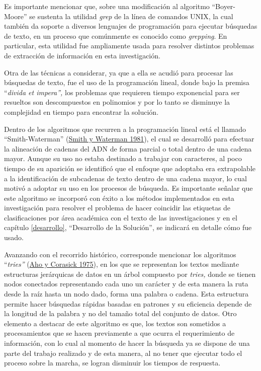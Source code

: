 \documentclass[
  12pt,
  openany]{book}
\begin{document}
Es importante mencionar que, sobre una modificación al algoritmo ``Boyer-Moore'' se sustenta la utilidad \emph{grep} de la línea de comandos UNIX, la cual también da soporte a diversos lenguajes de programación para ejecutar búsquedas de texto, en un proceso que comúnmente es conocido como \emph{grepping}. En particular, esta utilidad fue ampliamente usada para resolver distintos problemas de extracción de información en esta investigación.

Otra de las técnicas a considerar, ya que a ella se acudió para procesar las búsquedas de texto, fue el uso de la programación lineal, donde bajo la premisa ``\emph{divida et impera'',} los problemas que requieren tiempo exponencial para ser resueltos son descompuestos en polinomios y por lo tanto se disminuye la complejidad en tiempo para encontrar la solución.

Dentro de los algoritmos que recurren a la programación lineal está el llamado ``Smith-Waterman'' (\protect\hyperlink{ref-smith1981}{Smith y Waterman 1981}), el cual se desarrolló para efectuar la alineación de cadenas del ADN de forma parcial o total dentro de una cadena mayor. Aunque su uso no estaba destinado a trabajar con caracteres, al poco tiempo de su aparición se identificó que el enfoque que adoptaba era extrapolable a la identificación de subcadenas de texto dentro de una cadena mayor, lo cual motivó a adoptar su uso en los procesos de búsqueda. Es importante señalar que este algoritmo se incorporó con éxito a los métodos implementados en esta investigación para resolver el problema de hacer coincidir las etiquetas de clasificaciones por área académica con el texto de las investigaciones y en el capítulo \ref{desarrollo}, ``Desarrollo de la Solución'', se indicará en detalle cómo fue usado.

Avanzando con el recorrido histórico, corresponde mencionar los algoritmos ``\emph{tries''} (\protect\hyperlink{ref-aho1975}{Aho y Corasick 1975}), en los que se representan los textos mediante estructuras jerárquicas de datos en un árbol compuesto por \emph{tries,} donde se tienen nodos conectados representando cada uno un carácter y de esta manera la ruta desde la raíz hasta un nodo dado, forma una palabra o cadena. Esta estructura permite hacer búsquedas rápidas basadas en patrones y su eficiencia depende de la longitud de la palabra y no del tamaño total del conjunto de datos. Otro elemento a destacar de este algoritmo es que, los textos son sometidos a procesamientos que se hacen previamente a que ocurra el requerimiento de información, con lo cual al momento de hacer la búsqueda ya se dispone de una parte del trabajo realizado y de esta manera, al no tener que ejecutar todo el proceso sobre la marcha, se logran disminuir los tiempos de respuesta.
\end{document}
